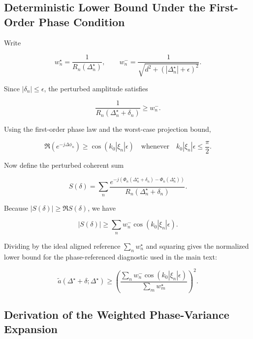 \subsection{Deterministic Lower Bound Under the First-Order Phase Condition}

Write

\begin{equation}
w_n^\star = \frac{1}{R_n(\Delta_n^\star)},
\qquad
w_n^- = \frac{1}{\sqrt{d^2+(|\Delta_n^\star|+\epsilon)^2}}.
\label{eq:app_weights}
\end{equation}

Since $|\delta_n|\le\epsilon$, the perturbed amplitude satisfies

\begin{equation}
\frac{1}{R_n(\Delta_n^\star+\delta_n)} \ge w_n^-.
\label{eq:app_ampbound}
\end{equation}

Using the first-order phase law and the worst-case projection bound,

\begin{equation}
\Re\left(e^{-j\Delta\phi_n}\right)
\ge \cos(k_0|\xi_n|\epsilon)
\quad \text{whenever} \quad
k_0|\xi_n|\epsilon \le \frac{\pi}{2}.
\label{eq:app_proj}
\end{equation}

Now define the perturbed coherent sum

\begin{equation}
S(\delta)
= \sum_n \frac{e^{-j(\Phi_n(\Delta_n^\star+\delta_n)-\Phi_n(\Delta_n^\star))}}{R_n(\Delta_n^\star+\delta_n)}.
\label{eq:app_sum}
\end{equation}

Because $|S(\delta)| \ge \Re S(\delta)$, we have

\begin{equation}
|S(\delta)|
\ge
\sum_n w_n^- \cos(k_0|\xi_n|\epsilon).
\label{eq:app_rebound}
\end{equation}

Dividing by the ideal aligned reference $\sum_n w_n^\star$ and squaring gives the normalized lower bound for the phase-referenced diagnostic used in the main text:

\begin{equation}
\tilde{a}(\Delta^\star+\delta;\Delta^\star)
\ge
\left(
\frac{\sum_n w_n^- \cos(k_0|\xi_n|\epsilon)}
{\sum_m w_m^\star}
\right)^2.
\label{eq:app_fullbound}
\end{equation}

\subsection{Derivation of the Weighted Phase-Variance Expansion}

